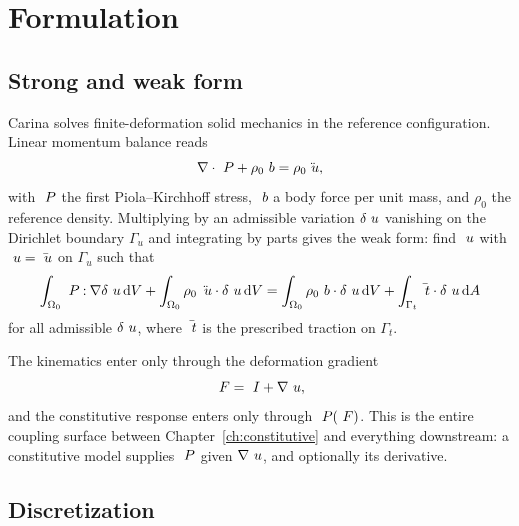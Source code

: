 \chapter{Formulation}
\label{ch:formulation}

\section{Strong and weak form}

Carina solves finite-deformation solid mechanics in the reference
configuration.  Linear momentum balance reads
\begin{equation}
  \nabla \cdot ~P + \rho_0 ~b = \rho_0 \ddot{~u},
  \label{eq:momentum}
\end{equation}
with $~P$ the first Piola--Kirchhoff stress, $~b$ a body force per
unit mass, and $\rho_0$ the reference density.  Multiplying by an admissible
variation $\delta~u$ vanishing on the Dirichlet boundary $\Gamma_u$ and
integrating by parts gives the weak form: find $~u$ with $~u =
\bar{~u}$ on $\Gamma_u$ such that
\begin{equation}
  \int_{\Omega_0} ~P \mathbin{:} \nabla \delta~u \, \mathrm{d}V
  + \int_{\Omega_0} \rho_0\, \ddot{~u} \cdot \delta~u \, \mathrm{d}V
  = \int_{\Omega_0} \rho_0 ~b\cdot\delta~u \, \mathrm{d}V
  + \int_{\Gamma_t} \bar{~t} \cdot \delta~u \, \mathrm{d}A
  \label{eq:weak}
\end{equation}
for all admissible $\delta~u$, where $\bar{~t}$ is the prescribed
traction on $\Gamma_t$.

The kinematics enter only through the deformation gradient
\begin{equation}
  ~F = ~I + \nabla~u ,
\end{equation}
and the constitutive response enters only through $~P(~F)$.  This is the
entire coupling surface between Chapter~\ref{ch:constitutive} and everything
downstream: a constitutive model supplies $~P$ given $\nabla~u$, and
optionally its derivative.

\section{Discretization}

